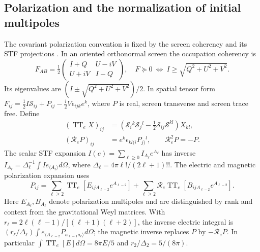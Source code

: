 \subsection{Polarization and the normalization of initial multipoles}
\label{geo:polarized_initial}
The covariant polarization convention is fixed by the screen coherency and its STF projections \cite{Challinor2000,Pitrou2021}. In an oriented orthonormal screen the occupation coherency is
\begin{equation}
 F_{AB}=\tfrac12\begin{pmatrix}I+Q&U-iV\\U+iV&I-Q\end{pmatrix},\quad
 F\succeq0\ \Longleftrightarrow\ I\ge\sqrt{Q^2+U^2+V^2}.
 \label{geo:screen_positivity}
\end{equation}
Its eigenvalues are $(I\pm\sqrt{Q^2+U^2+V^2})/2$. In spatial tensor form
$F_{ij}=\frac12I\mathcal S_{ij}+P_{ij}-\frac i2V\epsilon_{ijk}e^k$, where $P$ is real, screen transverse and screen trace free. Define
\begin{align}
 (\operatorname{TT}_eX)_{ij}&=\left(\mathcal S_i{}^k\mathcal S_j{}^l
                 -\tfrac12\mathcal S_{ij}\mathcal S^{kl}\right)X_{kl},\nonumber\\
 (\mathcal R_eP)_{ij}&=e^k\epsilon_{kl(i}P_{j)}{}^l,\qquad
 \mathcal R_e^2P=-P.
 \label{geo:screen_rotation}
\end{align}
The scalar STF expansion $I(e)=\sum_{\ell\ge0}I_{A_\ell}e^{A_\ell}$ has inverse
$I_{A_\ell}=\Delta_\ell^{-1}\int I e_{\langle A_\ell\rangle}d\Omega$, where
$\Delta_\ell=4\pi\ell!/(2\ell+1)!!$. The electric and magnetic polarization expansion uses
\begin{equation}
 P_{ij}=\sum_{\ell\ge2}\operatorname{TT}_e[
 E_{ijA_{\ell-2}}e^{A_{\ell-2}}]
 +\sum_{\ell\ge2}\mathcal R_e\operatorname{TT}_e[
 B_{ijA_{\ell-2}}e^{A_{\ell-2}}].
 \label{geo:polarization_expansion}
\end{equation}
Here $E_{A_\ell},B_{A_\ell}$ denote polarization multipoles and are distinguished by rank and context from the gravitational Weyl matrices. With
$r_\ell=2\ell(\ell-1)/[(\ell+1)(\ell+2)]$, the inverse electric integral is
$(r_\ell/\Delta_\ell)\int e_{\langle A_{\ell-2}}P_{a_{\ell-1}a_\ell\rangle}d\Omega$;
the magnetic inverse replaces $P$ by $-\mathcal R_eP$. In particular
$\int\operatorname{TT}_e[E]d\Omega=8\pi E/5$ and $r_2/\Delta_2=5/(8\pi)$.

